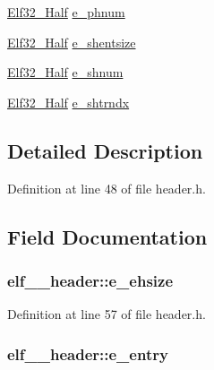 \begin{DoxyCompactItemize}
\item 
\hyperlink{header_8h_a36b5c3e0acdf5b2949591cd07480d10b}{Elf32\_\-Half} \hyperlink{structelf__32__header_af0a0631bd17fedab7907fa3b057a1746}{e\_\-phnum}
\item 
\hyperlink{header_8h_a36b5c3e0acdf5b2949591cd07480d10b}{Elf32\_\-Half} \hyperlink{structelf__32__header_a8c6553a68b2f6ef39c613381b0dd1700}{e\_\-shentsize}
\item 
\hyperlink{header_8h_a36b5c3e0acdf5b2949591cd07480d10b}{Elf32\_\-Half} \hyperlink{structelf__32__header_a0b59b0c17c7d8676611fa95e6478085d}{e\_\-shnum}
\item 
\hyperlink{header_8h_a36b5c3e0acdf5b2949591cd07480d10b}{Elf32\_\-Half} \hyperlink{structelf__32__header_a4c98bca5dcfaea4cb18b26ba8942af72}{e\_\-shtrndx}
\end{DoxyCompactItemize}


\subsection{Detailed Description}


Definition at line 48 of file header.h.



\subsection{Field Documentation}
\hypertarget{structelf__32__header_accab601e805e6f7088fcf56e50cde7d0}{
\subsubsection[{e\_\-ehsize}]{ {\bf elf\_\_\-header::e\_\-ehsize}}}
\label{structelf__32__header_accab601e805e6f7088fcf56e50cde7d0}


Definition at line 57 of file header.h.

\hypertarget{structelf__32__header_a6c0fef788e2dc2043aa91b26429459bf}{
\subsubsection[{e\_\-entry}]{ {\bf elf\_\_\-header::e\_\-entry}}}
\label{structelf__32__header_a6c0fef788e2dc2043aa91b26429459bf}


